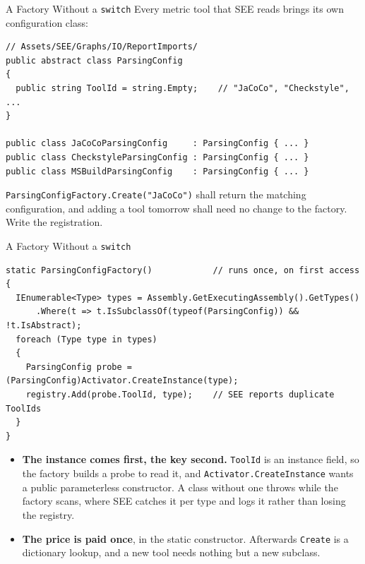 \begin{exerciseframe}{A Factory Without a \texttt{switch}}
  Every metric tool that SEE reads brings its own configuration class:
  \vspace{1ex}

  \begin{lstlisting}[basicstyle=\scriptsize\ttfamily]
// Assets/SEE/Graphs/IO/ReportImports/
public abstract class ParsingConfig
{
  public string ToolId = string.Empty;    // "JaCoCo", "Checkstyle", ...
}

public class JaCoCoParsingConfig     : ParsingConfig { ... }
public class CheckstyleParsingConfig : ParsingConfig { ... }
public class MSBuildParsingConfig    : ParsingConfig { ... }
  \end{lstlisting}
  \vspace{1ex}

  \texttt{ParsingConfigFactory.Create("JaCoCo")} shall return the matching
  configuration, and adding a tool tomorrow shall need no change to the
  factory. Write the registration.
\end{exerciseframe}

\begin{solutionframe}{A Factory Without a \texttt{switch}}
  \begin{lstlisting}[basicstyle=\scriptsize\ttfamily]
static ParsingConfigFactory()            // runs once, on first access
{
  IEnumerable<Type> types = Assembly.GetExecutingAssembly().GetTypes()
      .Where(t => t.IsSubclassOf(typeof(ParsingConfig)) && !t.IsAbstract);
  foreach (Type type in types)
  {
    ParsingConfig probe = (ParsingConfig)Activator.CreateInstance(type);
    registry.Add(probe.ToolId, type);    // SEE reports duplicate ToolIds
  }
}
  \end{lstlisting}
  \vspace{0.5ex}

  \begin{itemize}
    \item \textbf{The instance comes first, the key second.} \texttt{ToolId} is
      an instance field, so the factory builds a probe to read it, and
      \texttt{Activator.CreateInstance} wants a public parameterless
      constructor. A class without one throws while the factory scans, where
      SEE catches it per type and logs it rather than losing the registry.
    \item \textbf{The price is paid once}, in the static constructor. Afterwards
      \texttt{Create} is a dictionary lookup, and a new tool needs nothing but
      a new subclass.
  \end{itemize}
\end{solutionframe}
